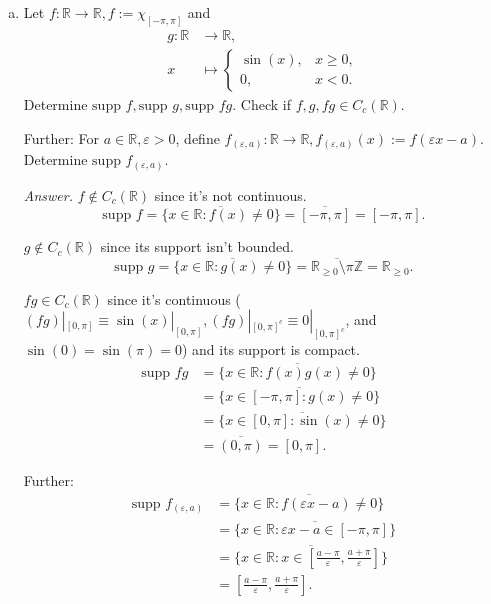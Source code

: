 \documentclass[10pt]{article}\usepackage[]{graphicx}\usepackage[]{color}
\newcommand{\Z}{\mathbb{Z}}
\newcommand{\R}{\mathbb{R}}
\begin{document}
\begin{enumerate}[(a)]
  \item Let $f : \R \to \R, f:= \chi_{[-\pi, \pi]}$ and
  \begin{align*}
    g: \R &\to \R,\\
    x &\mapsto
    \begin{cases}
      \sin(x),    & x \geq 0,\\
      0,          & x < 0.
    \end{cases}
  \end{align*}
    Determine $\textrm{supp~} f, \textrm{supp~} g, \textrm{supp~} fg$.
    Check if $f,g,fg \in C_c(\R)$.

    Further: For $a \in \R, \varepsilon > 0$,
    define $f_{(\varepsilon, a)}: \R \to \R, f_{(\varepsilon, a)}(x) := f(\varepsilon x - a)$.
    Determine $\textrm{supp~} f_{(\varepsilon, a)}$.

    \textit{Answer.} $f \notin C_c(\R)$ since it's not continuous.
    \[
      \textrm{supp~} f = \overline{\{x \in \R: f(x) \neq 0\}} = \overline{[-\pi, \pi]} = [-\pi, \pi].
    \]

    $g \notin C_c(\R)$ since its support isn't bounded.
        \[
      \textrm{supp~} g = \overline{\{x \in \R: g(x) \neq 0\}} = \overline{\R_{\geq 0} \setminus \pi \Z} = \R_{\geq 0}.
    \]

    $fg \in C_c(\R)$ since it's continuous 
    ($(fg)|_{[0, \pi]} \equiv \sin(x)|_{[0, \pi]}, (fg)|_{[0, \pi]^c} \equiv 0|_{[0, \pi]^c}$, 
    and $\sin(0) = \sin(\pi) = 0$) 
    and its support is compact.
    \begin{align*}
      \textrm{supp~} fg
      &= \overline{\{x \in \R : f(x)g(x) \neq 0\}} \\
      &= \overline{\{x \in [-\pi, \pi] : g(x) \neq 0\}} \\
      &= \overline{\{x \in [0, \pi] : \sin(x) \neq 0\}} \\
      &= \overline{(0, \pi)} = [0, \pi].
    \end{align*}

    Further:
    \begin{align*}
      \textrm{supp~} f_{(\varepsilon, a)}
      &= \overline{\{x \in \R : f(\varepsilon x - a) \neq 0\}} \\
      &= \overline{\{x \in \R : \varepsilon x - a \in [-\pi, \pi]\}} \\
      &= \overline{\{x \in \R : x \in [\frac{a - \pi}{\varepsilon}, \frac{a + \pi}{\varepsilon}]\}} \\
      &= [\frac{a - \pi}{\varepsilon}, \frac{a + \pi}{\varepsilon}].
    \end{align*}
\end{enumerate}
\end{document}

